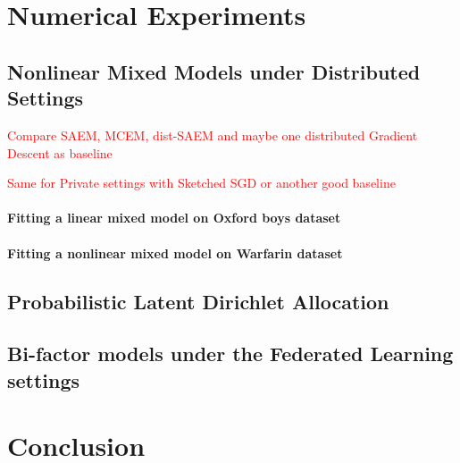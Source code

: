 \documentclass[11pt]{article}
\theoremstyle{t}
\begin{document}
\clearpage
\section{Numerical Experiments}


\subsection{Nonlinear Mixed Models under Distributed Settings}

\textcolor{red}{Compare SAEM, MCEM, dist-SAEM and maybe one distributed Gradient Descent as baseline}

\textcolor{red}{Same for Private settings with Sketched SGD or another good baseline}


\paragraph{Fitting a linear mixed model on Oxford boys dataset \citep{pinheiro2006mixed}}

\paragraph{Fitting a nonlinear mixed model on Warfarin dataset \citep{international2009estimation}}


\subsection{Probabilistic Latent Dirichlet Allocation}



\subsection{Bi-factor models under the Federated Learning settings}

\clearpage

\section{Conclusion}


\newpage






\end{document}
